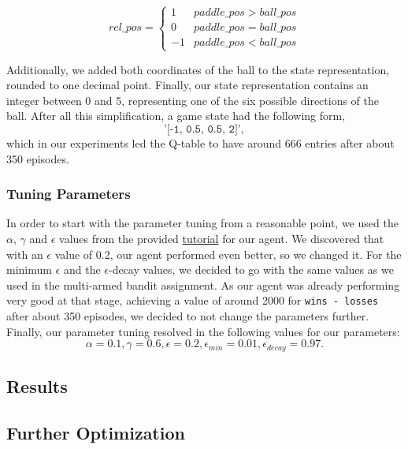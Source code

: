 \documentclass[10pt]{article}
\begin{document}
    \[\mathit{rel\_pos} = \begin{cases}
                              1 & \mathit{paddle\_pos} > \mathit{ball\_pos} \\
                              0 & \mathit{paddle\_pos} = \mathit{ball\_pos} \\
                              -1 & \mathit{paddle\_pos} < \mathit{ball\_pos}
    \end{cases}
    \]

    Additionally, we added both coordinates of the ball to the state representation, rounded to one decimal point.
    Finally, our state representation contains an integer between 0 and 5, representing one of the six possible directions of the ball.
    After all this simplification, a game state had the following form,\[\texttt{'[-1, 0.5, 0.5, 2]'},\] which in our experiments led the Q-table to have around 666 entries after about 350 episodes.

    \subsubsection{Tuning Parameters}
    In order to start with the parameter tuning from a reasonable point, we used the $\alpha$, $\gamma$ and $\epsilon$ values from the provided \href{https://www.learndatasci.com/tutorials/reinforcement-q-learning-scratch-python-openai-gym/}{tutorial} for our agent.
    We discovered that with an $\epsilon$ value of 0.2, our agent performed even better, so we changed it.
    For the minimum $\epsilon$ and the $\epsilon$-decay values, we decided to go with the same values as we used in the multi-armed bandit assignment.
    As our agent was already performing very good at that stage, achieving a value of around 2000 for \texttt{wins - losses} after about 350 episodes, we decided to not change the parameters further.
    Finally, our parameter tuning resolved in the following values for our parameters:
    \[\alpha = 0.1, \gamma = 0.6, \epsilon = 0.2, \epsilon_\mathit{min} = 0.01, \epsilon_\mathit{decay} = 0.97.\]

    \subsection{Results}\label{subsec:results}
    \subsection{Further Optimization}\label{subsec:further-optimization}
\end{document}
